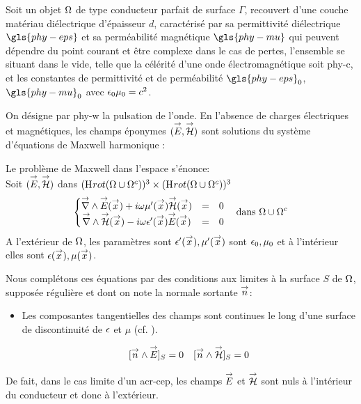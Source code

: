 Soit un objet \(\Omega\) de type conducteur parfait de surface \(\Gamma\), recouvert d'une couche matériau diélectrique d'épaisseur \(d\), caractérisé par sa permittivité diélectrique \(\gls{phy-eps}\) et sa perméabilité magnétique \(\gls{phy-mu}\) qui peuvent dépendre du point courant et être complexe dans le cas de pertes, l'ensemble se situant dans le vide, telle que la célérité d'une onde électromagnétique soit \gls{phy-c}, et les constantes de permittivité et de perméabilité \(\gls{phy-eps}_0\), \(\gls{phy-mu}_0\) avec \(\epsilon_0\mu_0 = c^{2}\).


On désigne par \gls{phy-w} la pulsation de l'onde.
En l'absence de charges électriques et magnétiques, les champs éponymes \(( {\overset{\rightarrow}{E}}, {\overset{\rightarrow}{\mathcal{H}}} )\) sont solutions du système d'équations de Maxwell harmonique : 

Le problème de Maxwell dans l'espace s'énonce: \\

Soit \(({\overset{\rightarrow}{E}},{\overset{\rightarrow}{\mathcal{H}}})\) dans \((\mathrm{H}_\mathrm{{}}{rot}(\Omega\cup\Omega^c))^3 \times (\mathrm{H}_\mathrm{{}}{rot}(\Omega\cup\Omega^c))^3\)
\begin{equation}
\label{eq:pres_th:intro:maxwell}
\left\lbrace \begin{matrix}
{\overset{\rightarrow}{\nabla}}\wedge {\overset{\rightarrow}{E}}({\overset{\rightarrow}{x}}) + i\omega\mu'({\overset{\rightarrow}{x}}) {\overset{\rightarrow}{\mathcal{H}}}({\overset{\rightarrow}{x}}) &=& 0 \\
{\overset{\rightarrow}{\nabla}}\wedge {\overset{\rightarrow}{\mathcal{H}}}({\overset{\rightarrow}{x}}) - i\omega\epsilon'({\overset{\rightarrow}{x}}) {\overset{\rightarrow}{E}}({\overset{\rightarrow}{x}}) &=& 0 \\
\end{matrix} \right.
\quad \text{dans \(\Omega\cup\Omega^c\)}
\end{equation}
A l'extérieur de \(\Omega\), les paramètres sont \(\epsilon'({\overset{\rightarrow}{x}}),\mu'({\overset{\rightarrow}{x}})\) sont \(\epsilon_0,\mu_0\) et à l'intérieur elles sont \(\epsilon({\overset{\rightarrow}{x}}),\mu({\overset{\rightarrow}{x}})\).


Nous complétons ces équations par des conditions aux limites à la surface \(S\) de \(\Omega\), supposée régulière et dont on note la normale sortante \({\overset{\rightarrow}{n}}\):
\begin{itemize}
  \item Les composantes tangentielles des champs sont continues le long d'une surface de discontinuité de \(\epsilon\) et \(\mu\) (cf. \cite[(2.10) p.~8]{senior_approximate_1995}).

  \begin{align}
  \label{eq:pres_th:intro:transmissions}[{\overset{\rightarrow}{n}} \wedge {\overset{\rightarrow}{E}}]_S = 0  \quad [{\overset{\rightarrow}{n}} \wedge {\overset{\rightarrow}{\mathcal{H}}}]_S = 0
  \end{align}
\end{itemize}
De fait, dans le cas limite d'un \gls{acr-cep}, les champs \({\overset{\rightarrow}{E}}\) et \({\overset{\rightarrow}{\mathcal{H}}}\) sont nuls à l'intérieur du conducteur et donc à l'extérieur.


